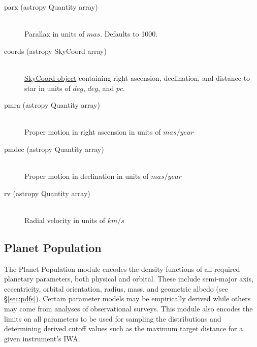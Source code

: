 \documentclass[cleanfoot]{asme2ej}
\begin{document}
\begin{itemize}
\begin{description}
    \item[parx (astropy Quantity array)] \hfill \\ Parallax in units of $ mas $. Defaults to 1000.
    \item[coords (astropy SkyCoord array)] \hfill \\ \href{http://astropy.readthedocs.org/en/latest/api/astropy.coordinates.SkyCoord.html}{SkyCoord object} containing right ascension, declination, and distance to star in units of $ deg $, $ deg $, and $ pc $.
    \item[pmra (astropy Quantity array)] \hfill \\ Proper motion in right ascension in units of $ mas/year $
    \item[pmdec (astropy Quantity array)] \hfill \\ Proper motion in declination in units of $ mas/year $
    \item[rv (astropy Quantity array)] \hfill \\ Radial velocity in units of $ km/s $
\end{description}
\end{itemize}



\subsection{Planet Population}
The Planet Population module encodes the density functions of all required planetary parameters, both physical and orbital. These include semi-major axis, eccentricity, orbital orientation, radius, mass, and geometric albedo (see \S\ref{sec:pdfs}). Certain parameter models may be empirically derived while others may come from analyses of observational surveys.  This module also encodes the limits on all parameters to be used for sampling the distributions and determining derived cutoff values such as the maximum target distance for a given instrument's IWA.
\end{document}
